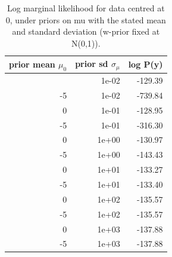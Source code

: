 \documentclass[
  letterpaper,
  DIV=11,
  numbers=noendperiod]{scrreprt}
\newenvironment{Shaded}{\begin{snugshade}}{\end{snugshade}}
\newcommand{\AttributeTok}[1]{\textcolor[rgb]{0.40,0.45,0.13}{#1}}
\newcommand{\ControlFlowTok}[1]{\textcolor[rgb]{0.00,0.23,0.31}{\textbf{#1}}}
\newcommand{\DecValTok}[1]{\textcolor[rgb]{0.68,0.00,0.00}{#1}}
\newcommand{\FloatTok}[1]{\textcolor[rgb]{0.68,0.00,0.00}{#1}}
\newcommand{\FunctionTok}[1]{\textcolor[rgb]{0.28,0.35,0.67}{#1}}
\newcommand{\NormalTok}[1]{\textcolor[rgb]{0.00,0.23,0.31}{#1}}
\newcommand{\OtherTok}[1]{\textcolor[rgb]{0.00,0.23,0.31}{#1}}
\newcommand{\SpecialCharTok}[1]{\textcolor[rgb]{0.37,0.37,0.37}{#1}}
\newcommand{\StringTok}[1]{\textcolor[rgb]{0.13,0.47,0.30}{#1}}
\begin{document}
\begin{Shaded}
\end{Shaded}

{

\begin{longtable}[]{@{}rrr@{}}

\caption{\label{tbl-compare-priors}Log marginal likelihood for data
centred at 0, under priors on mu with the stated mean and standard
deviation (w-prior fixed at N(0,1)).}

\tabularnewline

\toprule\noalign{}
prior mean \(\mu_0\) & prior sd \(\sigma_\mu\) & log P(y) \\
\midrule\noalign{}
\endhead
\bottomrule\noalign{}
\endlastfoot
0 & 1e-02 & -129.39 \\
-5 & 1e-02 & -739.84 \\
0 & 1e-01 & -128.95 \\
-5 & 1e-01 & -316.30 \\
0 & 1e+00 & -130.97 \\
-5 & 1e+00 & -143.43 \\
0 & 1e+01 & -133.27 \\
-5 & 1e+01 & -133.40 \\
0 & 1e+02 & -135.57 \\
-5 & 1e+02 & -135.57 \\
0 & 1e+03 & -137.88 \\
-5 & 1e+03 & -137.88 \\

\end{longtable}

}
\end{document}
